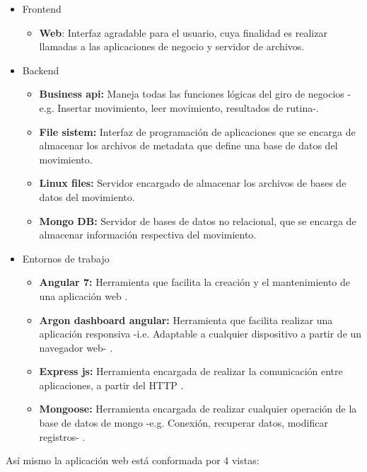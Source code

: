 \begin{itemize}
\item Frontend
	\begin{itemize}
	\item \textbf{Web}: Interfaz agradable para el usuario, cuya finalidad es realizar llamadas a las aplicaciones de negocio y servidor de archivos.
	\end{itemize}
\item Backend
	\begin{itemize}
	\item \textbf{Business api:} Maneja todas las  funciones l\'ogicas del giro de negocios -e.g. Insertar movimiento, leer movimiento, resultados de rutina-.
	\item \textbf{File sistem:} Interfaz de programaci\'on de aplicaciones que se encarga de almacenar los archivos de metadata que define una base de datos del movimiento.
		\item \textbf{Linux files:} Servidor encargado de almacenar los archivos de bases de datos del movimiento.
		\item \textbf{Mongo DB:} Servidor de bases de datos no relacional, que se encarga de almacenar informaci\'on respectiva del movimiento.
	\end{itemize}
\item Entornos de trabajo
\begin{itemize}
\item \textbf{Angular 7:} Herramienta que facilita la creaci\'on y el mantenimiento de una aplicaci\'on web \cite{angular2019}.
\item \textbf{Argon dashboard angular:} Herramienta  que facilita realizar una aplicaci\'on responsiva -i.e. Adaptable a cualquier dispositivo a partir de un navegador web- \cite{argonDash}.
\item \textbf{Express js:} Herramienta encargada de realizar la comunicaci\'on entre aplicaciones, a partir del \acrlong{HTTP} \cite{fileSistem2019}.
\item \textbf{Mongoose:} Herramienta encargada de realizar cualquier operaci\'on de la base de datos de mongo -e.g. Conexi\'on, recuperar datos, modificar registros- \cite{mongoose2019}.
\end{itemize}
\end{itemize}
As\'i mismo la aplicaci\'on web est\'a conformada por 4 vistas:

